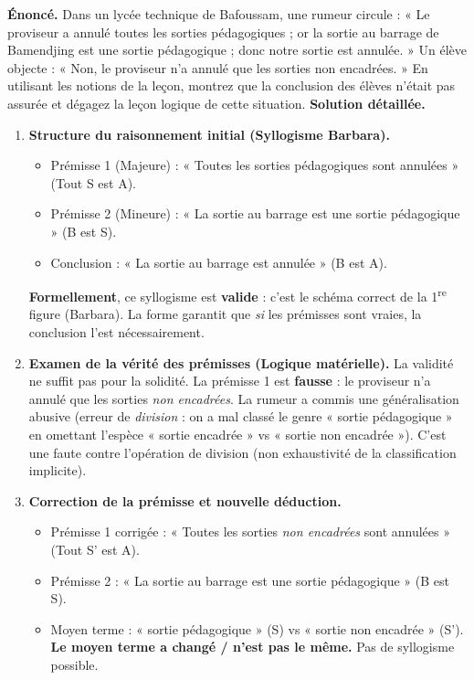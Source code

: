 \documentclass[11pt]{article}
\newcommand{\cle}[1]{{\popxbold\color{popdark}#1}}
\begin{document}
\begin{exoresolu}
\textbf{Énoncé.} Dans un lycée technique de Bafoussam, une rumeur circule : « Le proviseur a annulé toutes les sorties pédagogiques ; or la sortie au barrage de Bamendjing est une sortie pédagogique ; donc notre sortie est annulée. » Un élève objecte : « Non, le proviseur n'a annulé que les sorties non encadrées. » En utilisant les notions de la leçon, montrez que la conclusion des élèves n'était pas assurée et dégagez la leçon logique de cette situation.
\tcblower
\textbf{Solution détaillée.}
\begin{enumerate}
\item \textbf{Structure du raisonnement initial (Syllogisme Barbara).}
  \begin{itemize}
  \item Prémisse 1 (Majeure) : « Toutes les sorties pédagogiques sont annulées » (Tout S est A).
  \item Prémisse 2 (Mineure) : « La sortie au barrage est une sortie pédagogique » (B est S).
  \item Conclusion : « La sortie au barrage est annulée » (B est A).
  \end{itemize}
  \textbf{Formellement}, ce syllogisme est \textbf{valide} : c'est le schéma correct de la 1\textsuperscript{re} figure (Barbara). La forme garantit que \emph{si} les prémisses sont vraies, la conclusion l'est nécessairement.
\item \textbf{Examen de la vérité des prémisses (Logique matérielle).} La validité ne suffit pas pour la solidité. La prémisse 1 est \textbf{fausse} : le proviseur n'a annulé que les sorties \emph{non encadrées}. La rumeur a commis une \cle{généralisation abusive} (erreur de \emph{division} : on a mal classé le genre « sortie pédagogique » en omettant l'espèce « sortie encadrée » vs « sortie non encadrée »). C'est une faute contre l'opération de division (non exhaustivité de la classification implicite).
\item \textbf{Correction de la prémisse et nouvelle déduction.}
  \begin{itemize}
  \item Prémisse 1 corrigée : « Toutes les sorties \emph{non encadrées} sont annulées » (Tout S' est A).
  \item Prémisse 2 : « La sortie au barrage est une sortie pédagogique » (B est S).
  \item Moyen terme : « sortie pédagogique » (S) vs « sortie non encadrée » (S'). \textbf{Le moyen terme a changé / n'est pas le même.} Pas de syllogisme possible.

\end{itemize}
\end{enumerate}
\end{exoresolu}
\end{document}
